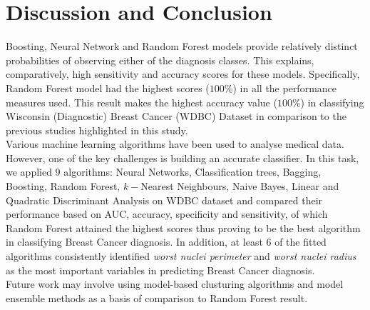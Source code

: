 \section{Discussion and Conclusion}

Boosting, Neural Network and Random Forest models provide relatively distinct probabilities of observing either of the diagnosis classes. This explains, comparatively, high sensitivity and accuracy scores for these models. Specifically, Random Forest model had the highest scores ($100\%$) in all the performance measures used. This result makes the highest accuracy value ($100\%$) in classifying Wisconsin (Diagnostic) Breast Cancer (WDBC) Dataset in comparison to the previous studies highlighted in this study.\\

\noindent Various machine learning algorithms have been used to analyse medical data. However, one of the key challenges is building an accurate classifier. In this task, we applied $9$ algorithms: Neural Networks, Classification trees, Bagging, Boosting, Random Forest, $k-$Nearest Neighbours, Naive Bayes, Linear and Quadratic Discriminant Analysis on WDBC dataset and compared their performance based on AUC, accuracy, specificity and sensitivity, of which Random Forest attained the highest scores thus proving to be the best algorithm in classifying Breast Cancer diagnosis. In addition, at least $6$ of the fitted algorithms consistently identified \textit{worst nuclei perimeter} and \textit{worst nuclei radius} as the most important variables in predicting Breast Cancer diagnosis.\\

\noindent Future work may involve using model-based clusturing algorithms and model ensemble methods as a basis of comparison to Random Forest result.

\newpage
%



